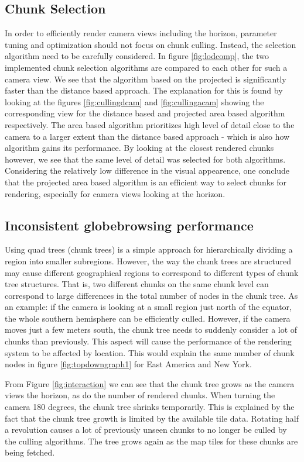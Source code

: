 \subsection{Chunk Selection}
In order to efficiently render camera views including the horizon, parameter tuning and optimization should not focus on chunk culling. 
Instead, the selection algorithm need to be carefully considered. 
In figure \ref{fig:lodcomp}, the two implemented chunk selection algorithms are compared to each other for such a camera view. 
We see that the algorithm based on the projected is significantly faster than the distance based approach. 
The explanation for this is found by looking at the figures \ref{fig:cullingdcam} and \ref{fig:cullingacam} showing the corresponding view for the distance based and projected area based algorithm respectively. 
The area based algorithm prioritizes high level of detail close to the camera to a larger extent than the distance based approach - which is also how algorithm gains its performance. 
By looking at the closest rendered chunks however, we see that the same level of detail was selected for both algorithms. 
Considering the relatively low difference in the visual appearence, one conclude that the projected area based algorithm is an efficient way to select chunks for rendering, especially for camera views looking at the horizon.

\subsection{Inconsistent globebrowsing performance}
Using quad trees (chunk trees) is a simple approach for hierarchically dividing a region into smaller subregions. 
However, the way the chunk trees are structured may cause different geographical regions to correspond to different types of chunk tree structures. 
That is, two different chunks on the same chunk level can correspond to large differences in the total number of nodes in the chunk tree. 
As an example: if the camera is looking at a small region just north of the equator, the whole southern hemisphere can be efficiently culled. 
However, if the camera moves just a few meters south, the chunk tree needs to suddenly consider a lot of chunks than previously. 
This aspect will cause the performance of the rendering system to be affected by location. 
This would explain the same number of chunk nodes in figure \ref{fig:topdowngraph1} for East America and New York. 

From Figure \ref{fig:interaction} we can see that the chunk tree grows as the camera views the horizon, as do the number of rendered chunks. When turning the camera 180 degrees, the chunk tree shrinks temporarily. This is explained by the fact that the chunk tree growth is limited by the available tile data. Rotating half a revolution causes a lot of previously unseen chunks to no longer be culled by the culling algorithms. The tree grows again as the map tiles for these chunks are being fetched. 



